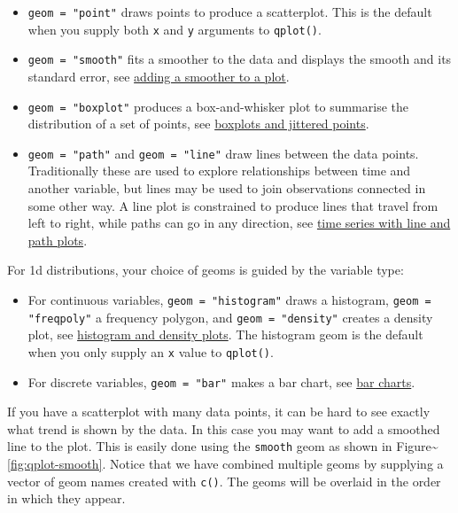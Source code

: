 \begin{itemize}
\item
  \texttt{geom = "point"} draws points to produce a scatterplot. This is
  the default when you supply both \texttt{x} and \texttt{y} arguments
  to \texttt{qplot()}.
\item
  \texttt{geom = "smooth"} fits a smoother to the data and displays the
  smooth and its standard error, see \hyperref[sub:smooth]{adding a
  smoother to a plot}.
\item
  \texttt{geom = "boxplot"} produces a box-and-whisker plot to summarise
  the distribution of a set of points, see
  \hyperref[sub:boxplot]{boxplots and jittered points}.
\item
  \texttt{geom = "path"} and \texttt{geom = "line"} draw lines between
  the data points. Traditionally these are used to explore relationships
  between time and another variable, but lines may be used to join
  observations connected in some other way. A line plot is constrained
  to produce lines that travel from left to right, while paths can go in
  any direction, see \hyperref[sub:line]{time series with line and path
  plots}.
\end{itemize}

\noindent For 1d distributions, your choice of geoms is guided by the
variable type:

\begin{itemize}
\item
  For continuous variables, \texttt{geom = "histogram"} draws a
  histogram, \texttt{geom = "freqpoly"} a frequency polygon, and
  \texttt{geom = "density"} creates a density plot, see
  \hyperref[sub:distribution]{histogram and density plots}. The
  histogram geom is the default when you only supply an \texttt{x} value
  to \texttt{qplot()}.
\item
  For discrete variables, \texttt{geom = "bar"} makes a bar chart, see
  \hyperref[sub:bar]{bar charts}.
\end{itemize}


If you have a scatterplot with many data points, it can be hard to see
exactly what trend is shown by the data. In this case you may want to
add a smoothed line to the plot. This is easily done using the
\texttt{smooth} geom as shown in
Figure\textasciitilde{}\ref{fig:qplot-smooth}. Notice that we have
combined multiple geoms by supplying a vector of geom names created with
\texttt{c()}. The geoms will be overlaid in the order in which they
appear.  

